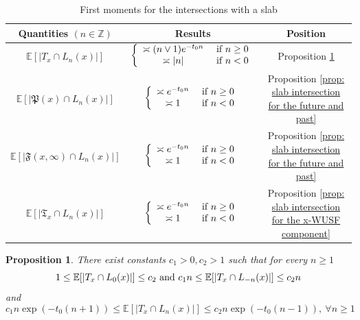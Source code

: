 \documentclass[12pt]{article}
\newtheorem{proposition}[theorem]{Proposition}
\numberwithin{equation}{section}
\newcommand{\be}{\begin{equation}}
\newcommand{\ee}{\end{equation}}
\newcommand{\1}{\mathbf{1}}
\begin{document}
 \begin{table}[ht]
 	\centering
 	\begin{tabular}{|c|c|c|}
 		\hline
 		Quantities $(n\in \mathbb{Z})$ & Results & Position\\
 		\hline
 		$\mathbb{E}[|T_x\cap L_n(x)|]$ & $\left\{
 		\begin{array}{cc}
 		\asymp (n\vee 1)e^{-t_0n} & \textnormal{ if }n\geq0\\
 		\asymp |n|& \textnormal{ if }n<0\\
 		\end{array}
 		\right.$ & Proposition \ref{prop: slab intersection for T_x}\\
 		\hline
 			$\mathbb{E}[|\mathfrak{P}(x)\cap L_n(x)|]$ &  $\left\{
 			\begin{array}{cc}
 			\asymp e^{-t_0n} & \textnormal{ if }n\geq0\\
 			\asymp 1& \textnormal{ if }n<0\\
 			\end{array}
 			\right.$ & Proposition \ref{prop: slab intersection for the future and past} \\
 		\hline
 		$\mathbb{E}[|\mathfrak{F}(x,\infty)\cap L_{n}(x)|]$ &  $\left\{
 		\begin{array}{cc}
 		\asymp e^{-t_0n} & \textnormal{ if }n\geq0\\
 		\asymp 1& \textnormal{ if }n<0\\
 		\end{array}
 		\right.$& Proposition \ref{prop: slab intersection for the future and past} \\
 		\hline
 		$\mathbb{E}[|\mathfrak{T}_x\cap L_{n}(x)|]$ & $\left\{
 		\begin{array}{cc}
 		\asymp e^{-t_0n} & \textnormal{ if }n\geq0\\
 		\asymp 1& \textnormal{ if }n<0\\
 		\end{array}
 		\right.$ & Proposition \ref{prop: slab intersection for the x-WUSF component}\\
 		\hline
 	\end{tabular}
 \centering
 	\caption{First moments for the intersections with a slab}
 	\label{table: first moments}
 \end{table}
 
 \begin{proposition}\label{prop: slab intersection for T_x}
 	There exist  constants $c_1>0,c_{2}>1$ such that for every $n\geq1$
 		\be\label{eq: expectation of intersection of T_x with a low slab}
 		1\leq \mathbb{E}[|T_x\cap L_{0}(x)|]\leq c_{2}\textnormal{ and }
 		c_1n\leq \mathbb{E}[|T_x\cap L_{-n}(x)|]\leq c_{2}n
 		\ee
 and
 	\be\label{eq: expectation of intersection of T_x with a high slab}
 	c_1n\exp(-t_0(n+1))\leq \mathbb{E}[|T_x\cap L_{n}(x)|]\leq c_{2}n\exp(-t_0(n-1)), \ \forall n\geq1
 	\ee	
 	
 \end{proposition}
 
\end{document}
